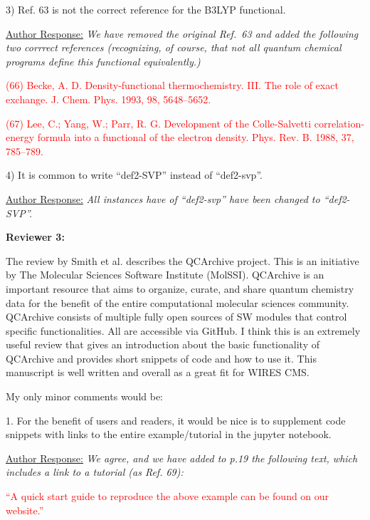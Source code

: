 \documentclass[12pt]{article}
\newcommand{\qcfN}{QCFractal}
\newcommand{\qcf}{{\sc{\qcfN}}\xspace}%
\begin{document}
3) Ref. 63 is not the correct reference for the B3LYP functional. 

\noindent
\underline{Author Response:} \textit{We have removed the original Ref.\ 63 and
added the following two corrrect references (recognizing, of course, that not
all quantum chemical programs define this functional equivalently.)}

\noindent
\textcolor{red}{(66) Becke, A. D. Density-functional thermochemistry. III. The
role of exact exchange. J. Chem. Phys. 1993, 98, 5648–5652.}

\noindent
\textcolor{red}{(67) Lee, C.; Yang, W.; Parr, R. G. Development of the Colle-Salvetti
correlation-energy formula into a functional of the electron density. Phys. Rev.
B. 1988, 37, 785–789.}

4) It is common to write ``def2-SVP'' instead of ``def2-svp''.

\noindent \underline{Author Response:} \textit{All instances have of
``def2-svp'' have been changed to ``def2-SVP''.}

\noindent\makebox[\linewidth]{\rule{\linewidth}{0.4pt}}

\noindent
\textbf{Reviewer 3:}

\noindent The review by Smith et al. describes the QCArchive project. This is
an initiative by The Molecular Sciences Software Institute (MolSSI). QCArchive
is an important resource that aims to organize, curate, and share quantum
chemistry data for the benefit of the entire computational molecular sciences
community.  QCArchive consists of multiple fully open sources of SW modules
that control specific functionalities. All are accessible via GitHub. I think
this is an extremely useful review that gives an introduction about the basic
functionality of QCArchive and provides short snippets of code and how to use
it. This manuscript is well written and overall as a great fit for WIRES CMS.

My only minor comments would be:

1.	For the benefit of users and readers, it would be nice is to supplement code snippets with links to the entire example/tutorial in the jupyter notebook.

\noindent
\underline{Author Response:} \textit{We agree, and we have added to p.19 the 
following text, which includes a link to a tutorial (as Ref. 69):}

\noindent
\textcolor{red}{``A \qcf quick start guide to reproduce the above example can be
found on our website.''}
\end{document}
